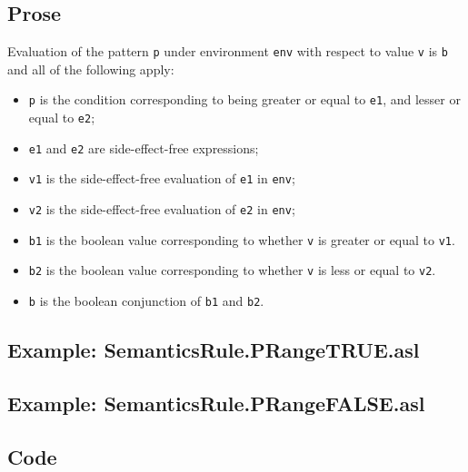 \documentclass{book}
\begin{document}
    \subsection{Prose}
  Evaluation of the pattern \texttt{p} under environment \texttt{env} with
  respect to value \texttt{v} is \texttt{b} and all of the following apply:
    \begin{itemize}
      \item \texttt{p} is the condition corresponding to being greater or equal
        to \texttt{e1}, and lesser or equal to \texttt{e2};
      \item \texttt{e1} and \texttt{e2} are side-effect-free expressions;
      \item \texttt{v1} is the side-effect-free evaluation of \texttt{e1} in
        \texttt{env};
      \item \texttt{v2} is the side-effect-free evaluation of \texttt{e2} in
        \texttt{env};
      \item \texttt{b1} is the boolean value corresponding to whether
        \texttt{v} is greater or equal to \texttt{v1}.
      \item \texttt{b2} is the boolean value corresponding to whether
        \texttt{v} is less or equal to \texttt{v2}.
      \item \texttt{b} is the boolean conjunction of \texttt{b1} and
        \texttt{b2}.
    \end{itemize}

    \subsection{Example: SemanticsRule.PRangeTRUE.asl}

    \subsection{Example: SemanticsRule.PRangeFALSE.asl}

  \subsection{Code}
\end{document}

